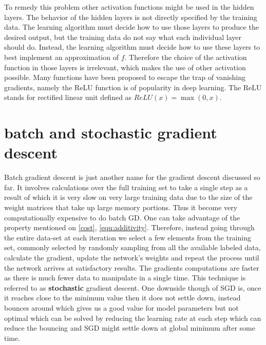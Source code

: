 To remedy this problem other activation functions might be used in the hidden layers. The behavior of the hidden layers is not directly
specified by the training data. The learning algorithm must decide how to use those layers to produce the desired output, but the training data do not say what each individual layer should do. Instead, the learning algorithm must decide how to use these layers to best implement an approximation of $f$. Therefore the choice of the activation function in those layers is irrelevant, which makes the use of other activation possible. Many functions have been proposed to escape the trap of vanishing gradients, namely the ReLU function is of popularity in deep learning. The ReLU stands for rectified linear unit defined as $ReLU(x) = \max (0, x)$.

\section{batch and stochastic gradient descent}

Batch gradient descent is just another name for the gradient descent discussed so far. It involves calculations over the full training set to take a single step as a result of which it is very slow on very large training data due to the size of the weight matrices that take up large memory portions. Thus it become very computationally expensive to do batch GD. One can take advantage of the property mentioned on \cref{cost}, \cref{equ:additivity}. Therefore, instead going through the entire data-set at each iteration we select a few elements from the
training set, commonly selected by randomly sampling from all the available labeled data, calculate the gradient, update the network's weights and repeat the process until the network arrives at satisfactory results. The gradients computations are faster as there is much fewer data to manipulate in a single time. This technique is referred to as \textbf{stochastic} gradient descent. One downside though of SGD is, once it reaches close to the minimum value then it does not settle down, instead bounces around which gives us a good value for model parameters but not optimal which can be solved by reducing the learning rate at each step which can reduce the bouncing and SGD might settle down at global minimum after some time.
